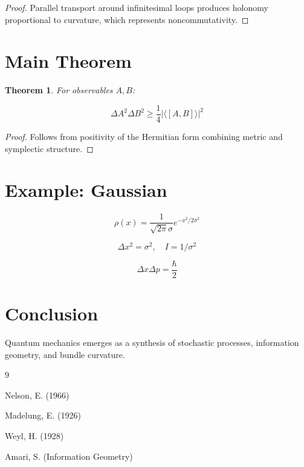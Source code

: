 \documentclass[11pt]{article}
\newtheorem{theorem}{Theorem}
\begin{document}
\begin{proof}
Parallel transport around infinitesimal loops produces holonomy proportional to curvature, which represents noncommutativity.
\end{proof}

\section{Main Theorem}

\begin{theorem}
For observables $A,B$:

\begin{equation}
\Delta A^2 \Delta B^2 \ge \frac{1}{4}|\langle [A,B]\rangle|^2
\end{equation}

\end{theorem}

\begin{proof}
Follows from positivity of the Hermitian form combining metric and symplectic structure.
\end{proof}

\section{Example: Gaussian}

\begin{equation}
\rho(x) = \frac{1}{\sqrt{2\pi}\sigma} e^{-x^2/2\sigma^2}
\end{equation}

\begin{equation}
\Delta x^2 = \sigma^2, \quad I = 1/\sigma^2
\end{equation}

\begin{equation}
\Delta x \Delta p = \frac{\hbar}{2}
\end{equation}

\section{Conclusion}

Quantum mechanics emerges as a synthesis of stochastic processes, information geometry, and bundle curvature.


\begin{thebibliography}{9}

 Nelson, E. (1966)

 Madelung, E. (1926)

 Weyl, H. (1928)

 Amari, S. (Information Geometry)

\end{thebibliography}
\end{document}
